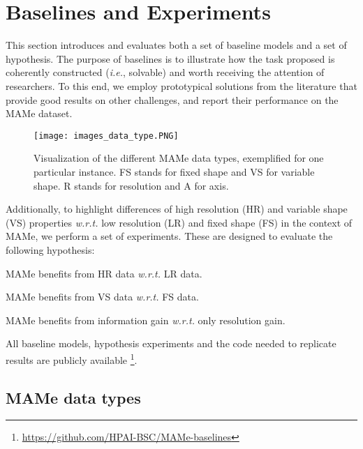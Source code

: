 \documentclass{article}
\newenvironment{hyp}{\hypx[H\textsubscript{\thehypx}]}{\endhypx}
\newcommand{\wrt}{{\it w.r.t. }}    \newcommand{\eg}{\emph{e.g.}, }     \newcommand{\ie}{\emph{i.e.}, }     \newcommand{\etal}{\emph{et al.}}   \newcommand\etc{\emph{etc.}}
\begin{document}
\section{Baselines and Experiments}\label{sec:baselines}

This section introduces and evaluates both a set of baseline models and a set of hypothesis. The purpose of baselines is to illustrate how the task proposed is coherently constructed (\ie solvable) and worth receiving the attention of researchers. To this end, we employ prototypical solutions from the literature that provide good results on other challenges, and report their performance on the MAMe dataset. 


\begin{figure}[t]
    \centering
    \texttt{[image: images\_data\_type.PNG]}
    \caption{Visualization of the different MAMe data types, exemplified for one particular instance. FS stands for fixed shape and VS for variable shape. R stands for resolution and A for axis.}
    \label{fig:data_type}
\end{figure}

Additionally, to highlight differences of high resolution (HR) and variable shape (VS) properties \wrt low resolution (LR) and fixed shape (FS) in the context of MAMe, we perform a set of experiments. These are designed to evaluate the following hypothesis:


\begin{hyp}\label{hyp:first}
MAMe benefits from HR data \wrt LR data.
\end{hyp}

\begin{hyp} \label{hyp:second}
MAMe benefits from VS data \wrt FS data.
\end{hyp}

\begin{hyp} \label{hyp:third}
MAMe benefits from information gain \wrt only resolution gain.
\end{hyp}

All baseline models, hypothesis experiments and the code needed to replicate results are publicly available \footnote{\url{https://github.com/HPAI-BSC/MAMe-baselines}}.

\subsection{MAMe data types}\label{sec:data_type}
\end{document}
